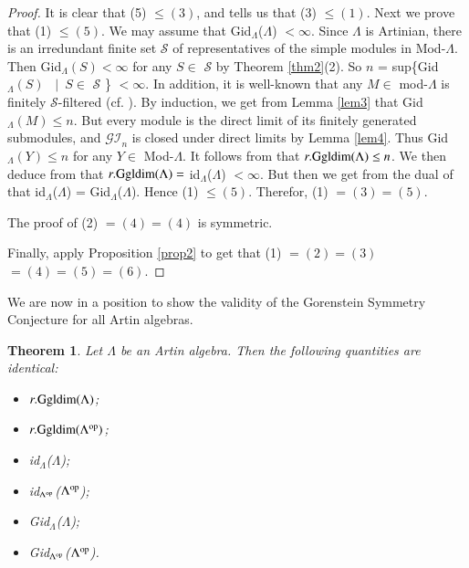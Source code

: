 \documentclass[11pt,a4paper]{article}
\newtheorem{thm}{Theorem}[section]
\begin{document}
 \begin{proof} It is clear that (5) $\leq (3)$, and \cite[Theorem 3.3]{bou1} tells us that  (3) $\leq (1)$.
 Next we prove that (1) $\leq (5)$. We may assume that   {\rm Gid}$_{\Lambda}$($\Lambda$)  $< \infty$.
Since $\Lambda$ is  Artinian,   there is an irredundant finite set   $\mathscr{S}$ of representatives of the simple modules in Mod-$\Lambda$.
Then  {\rm Gid}$_{\Lambda}(S)  < \infty$ for any $S\in $  $\mathscr{S}$ by Theorem \ref{thm2}(2).
 So $n$ = sup\{Gid$_{\Lambda}(S)$ \ $|$\   $S\in $  $\mathscr{S}$ \} $  < \infty$. In addition, it is well-known that any $M \in $ mod-$\Lambda$
 is  finitely  $\mathscr{S}$-filtered (cf. \cite[Proposition 11.1]{and}). By induction, we get from Lemma \ref{lem3} that
 Gid$_{\Lambda}(M) \leq n.$ But every   module   is the  direct limit of its  finitely generated submodules, and $\mathscr{GI}_{n}$ is closed under direct limits  by Lemma \ref{lem4}.
  Thus  Gid$_{\Lambda}(Y) \leq n$  for any    $Y\in $ Mod-$\Lambda$.  It follows from \cite[Theorem 1.1]{bem} that $r.{\rm Ggldim(}\Lambda) \leq n$. We then deduce from
 \cite[Lemma 2.1]{bem} that  $r.{\rm Ggldim(}\Lambda) =$  {\rm id}$_{\Lambda}$($\Lambda$) $< \infty$. But then we get  from   the dual of  \cite[Proposition 2.27]{hol} that {\rm id}$_{\Lambda}$($\Lambda$)
 = {\rm Gid}$_{\Lambda}$($\Lambda$).
Hence (1) $\leq (5)$. Therefor, (1) $= (3) = (5)$.

 The proof of  (2) $= (4) = (4)$  is symmetric.

Finally, apply Proposition \ref{prop2} to get that (1) $= (2) = (3)$   $= (4) = (5) = (6)$.
 \end{proof}

   We are now in a position to show the validity of  the Gorenstein Symmetry Conjecture
for all  Artin algebras.

\begin{thm}\label{thm4}  Let  $\Lambda$ be an Artin algebra. Then the following quantities are identical:
\begin{itemize}

\item[$(1)$] $r.{\rm Ggldim(}\Lambda)$;
\item[$(2)$] $r.{\rm Ggldim(}\Lambda^{{\rm op}})$;
\item[$(3)$]  {\rm id}$_{\Lambda}$($\Lambda$);
 \item[$(4)$] {\rm id}$_{\Lambda^{{\rm op}}}$($\Lambda^{{\rm op}}$);
 \item[$(5)$]  {\rm Gid}$_{\Lambda}$($\Lambda$);
 \item[$(6)$] {\rm Gid}$_{\Lambda^{{\rm op}}}$($\Lambda^{{\rm op}}$).\end{itemize}\end{thm}
\end{document}
